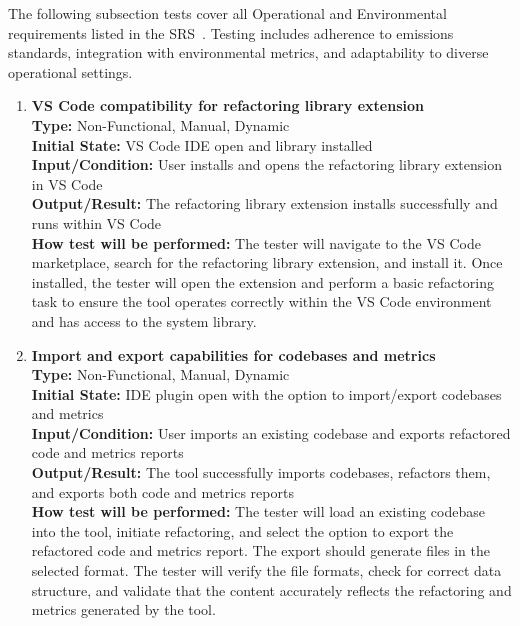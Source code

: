 \documentclass[12pt, titlepage]{article}
\begin{document}
\medskip

\noindent
The following subsection tests cover all Operational and Environmental requirements listed in the SRS~\cite{SRS}. Testing includes adherence to emissions standards, integration with environmental metrics, and adaptability to diverse operational settings.

\begin{enumerate}[label={\bf \textcolor{Maroon}{test-OPE-\arabic*}}, wide=0pt, font=\itshape]
  \item \textbf{VS Code compatibility for refactoring library extension} \\[2mm]
    \textbf{Type:} Non-Functional, Manual, Dynamic \\
    \textbf{Initial State:} VS Code IDE open and library installed\\
    \textbf{Input/Condition:} User installs and opens the refactoring library extension in VS Code \\
    \textbf{Output/Result:} The refactoring library extension installs successfully and runs within VS Code \\[2mm]
    \textbf{How test will be performed:} The tester will navigate to the VS Code marketplace, search for the refactoring library extension, and install it. Once installed, the tester will open the extension and perform a basic refactoring task to ensure the tool operates correctly within the VS Code environment and has access to the system library.

  \item \textbf{Import and export capabilities for codebases and metrics} \\[2mm]
    \textbf{Type:} Non-Functional, Manual, Dynamic \\
    \textbf{Initial State:} IDE plugin open with the option to import/export codebases and metrics \\
    \textbf{Input/Condition:} User imports an existing codebase and exports refactored code and metrics reports \\
    \textbf{Output/Result:} The tool successfully imports codebases, refactors them, and exports both code and metrics reports \\[2mm]
    \textbf{How test will be performed:} The tester will load an existing codebase into the tool, initiate refactoring, and select the option to export the refactored code and metrics report. The export should generate files in the selected format. The tester will verify the file formats, check for correct data structure, and validate that the content accurately reflects the refactoring and metrics generated by the tool.


\end{enumerate}
\end{document}
